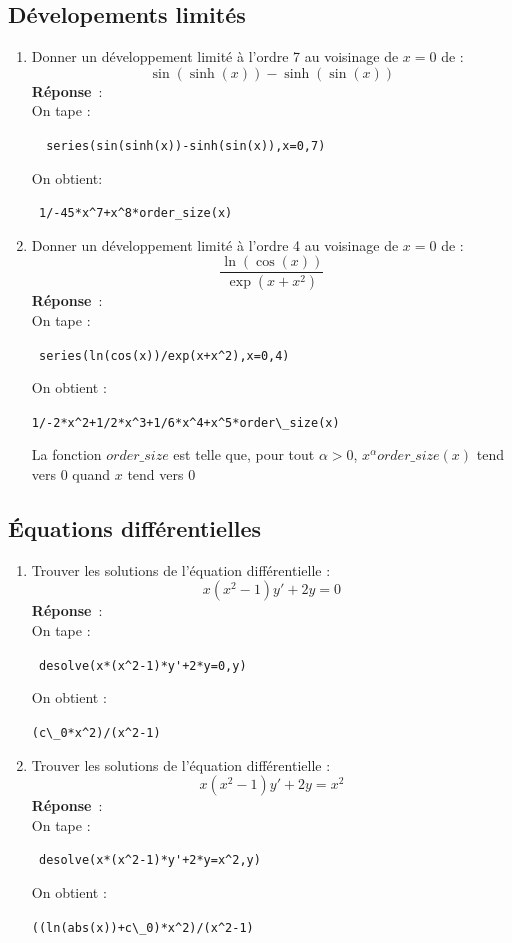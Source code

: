 \documentclass{article}
\begin{document}
\subsection{D\'evelopements limit\'es}
\begin{enumerate}
\item Donner un d\'eveloppement limit\'e \`a l'ordre 7 au voisinage de $x=0$
 de :
$$\sin(\sinh(x))-\sinh(\sin(x))$$
{\bf R\'eponse}~:\\
On tape :
\begin{center}
\verb|  series(sin(sinh(x))-sinh(sin(x)),x=0,7)|
\end{center}
On obtient:
\begin{center}
\verb| 1/-45*x^7+x^8*order_size(x)|
\end{center}
\item Donner un d\'eveloppement limit\'e \`a l'ordre 4 au voisinage de $x=0$ 
de :
$$\frac{\ln(\cos(x))}{\exp(x+x^2)}$$
{\bf R\'eponse}~:\\
On tape :
\begin{center}
\verb| series(ln(cos(x))/exp(x+x^2),x=0,4)|
\end{center}
On obtient :
\begin{center}
\verb|1/-2*x^2+1/2*x^3+1/6*x^4+x^5*order\_size(x)|
\end{center}
La fonction $order\_size$ est telle que, pour tout $\alpha>0$, 
$x^\alpha order\_size(x)$ tend vers 0 quand $x$ tend vers 0 
\end{enumerate}

\subsection{\'Equations diff\'erentielles}
\begin{enumerate}
\item Trouver les solutions de l'\'equation diff\'erentielle :
$$x(x^2-1)y'+2y=0$$
{\bf R\'eponse}~:\\
On tape :
\begin{center}
\verb| desolve(x*(x^2-1)*y'+2*y=0,y)|
\end{center}
On obtient :
\begin{center}
\verb|(c\_0*x^2)/(x^2-1)|
\end{center}

\item Trouver les solutions de l'\'equation diff\'erentielle :
$$x(x^2-1)y'+2y=x^2$$
{\bf R\'eponse}~:\\
On tape :
\begin{center}
\verb| desolve(x*(x^2-1)*y'+2*y=x^2,y)|
\end{center}
On obtient :
\begin{center}
\verb|((ln(abs(x))+c\_0)*x^2)/(x^2-1)|
\end{center}
\end{enumerate}
\end{document}
